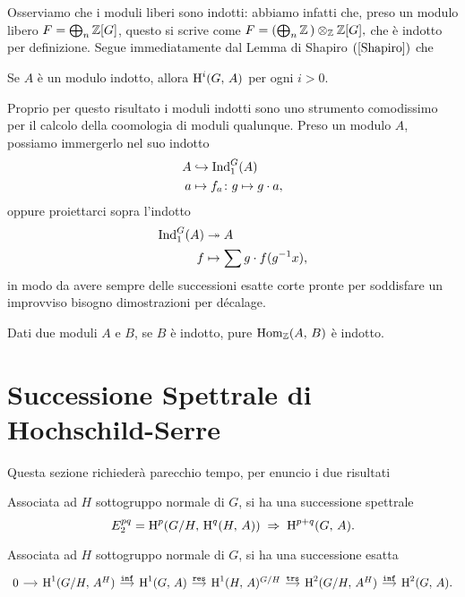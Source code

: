 Osserviamo che i moduli liberi sono indotti: abbiamo infatti che, preso un modulo libero $ F = \bigoplus_n \mathbb{Z}[G] $, questo si scrive come
$ F = \left(\bigoplus_n\mathbb{Z}\,\right) \otimes_{\mathbb{Z}} \mathbb{Z}[G],  $ che è indotto per definizione.
Segue immediatamente dal Lemma di Shapiro $ (\ref{Shapiro}) $ che
\begin{corollary}\label{indotti}
	Se $ A $ è un modulo indotto, allora $ \operatorname{H}^i(G, \, A) $ per ogni $ i > 0 $.
\end{corollary}

Proprio per questo risultato i moduli indotti sono uno strumento comodissimo per il calcolo della coomologia di moduli qualunque. Preso un modulo $ A $, possiamo immergerlo nel suo indotto
\begin{align*}
A &\hookrightarrow \operatorname{Ind}_1^G(A) \\
a & \mapsto f_a \colon g \mapsto g \cdot a, \end{align*} 
oppure proiettarci sopra l'indotto
\begin{align*}
\operatorname{Ind}_1^G(A) &\twoheadrightarrow A  \\
f & \mapsto \sum g \cdot f(g^{-1}x),
\end{align*}
in modo da avere sempre delle successioni esatte corte pronte per soddisfare un improvviso bisogno dimostrazioni per décalage.

\begin{lemma}\label{scappa}
	Dati due moduli $ A $ e $ B $, se $ B $ è indotto, pure $ \operatorname{Hom}_{\mathbb{Z}}(A, \, B) $ è indotto.
\end{lemma}

\section{Successione Spettrale di Hochschild-Serre}

Questa sezione richiederà parecchio tempo, per enuncio i due risultati

\begin{theorem}
	Associata ad $ H $ sottogruppo normale di $ G $, si ha una successione spettrale
	\[ E^{pq}_2 = \operatorname{H}^p(G/H, \, \operatorname{H}^q(H, \, A)) \;\Rightarrow\; \operatorname{H}^{p+q}(G, \, A). \]
\end{theorem}

\begin{corollary}\label{boo1}
	Associata ad $ H $ sottogruppo normale di $ G $, si ha una successione esatta
	\[\begin{tikzcd}[column sep = small]
	0 \rar & \HH^1(G/H, \, A^H) \rar["\Inf"]
	& \HH^1(G, \, A) \rar["\Res"]
	& \HH^1(H, \, A)^{G/H} \rar["\texttt{trs}"]
	& \HH^2(G/H, \, A^H) \rar["\Inf"]
	& \HH^2(G, \, A).
	\end{tikzcd} \]
\end{corollary}

